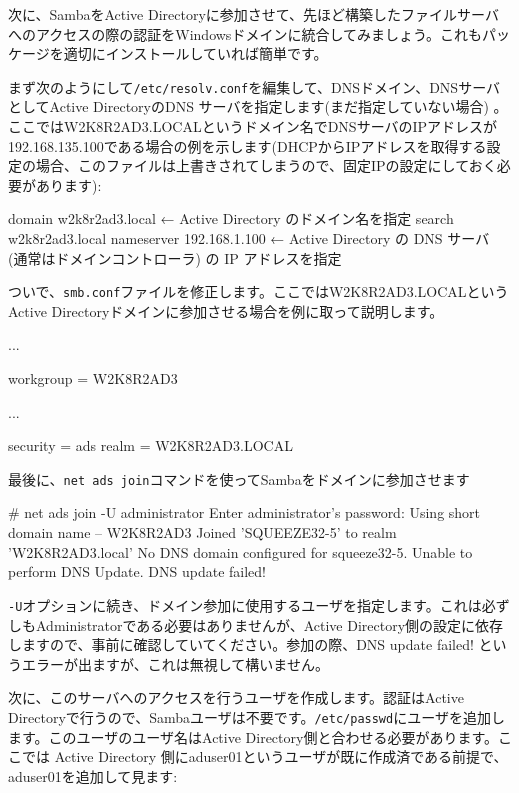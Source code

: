 \documentclass[mingoth,a4paper]{jsarticle}
\begin{document}
次に、SambaをActive Directoryに参加させて、先ほど構築したファイルサーバへのアクセスの際の認証をWindowsドメインに統合してみましょう。これもパッケージを適切にインストールしていれば簡単です。

まず次のようにして{\tt{/etc/resolv.conf}}を編集して、DNSドメイン、DNSサーバとしてActive DirectoryのDNS サーバを指定します(まだ指定していない場合) 。ここではW2K8R2AD3.LOCALというドメイン名でDNSサーバのIPアドレスが192.168.135.100である場合の例を示します(DHCPからIPアドレスを取得する設定の場合、このファイルは上書きされてしまうので、固定IPの設定にしておく必要があります):

\begin{commandline}
domain w2k8r2ad3.local ← Active Directory のドメイン名を指定
search w2k8r2ad3.local
nameserver 192.168.1.100 ← Active Directory の DNS サーバ (通常はドメインコントローラ) の IP アドレスを指定
\end{commandline}

ついで、{\tt{smb.conf}}ファイルを修正します。ここではW2K8R2AD3.LOCALというActive Directoryドメインに参加させる場合を例に取って説明します。

\begin{commandline}
[global]
  ...

  workgroup = W2K8R2AD3

  ...

  security = ads
  realm = W2K8R2AD3.LOCAL
\end{commandline}

最後に、{\tt{net ads join}}コマンドを使ってSambaをドメインに参加させます

\begin{commandline}
# net ads join -U administrator
Enter administrator's password:
Using short domain name -- W2K8R2AD3
Joined 'SQUEEZE32-5' to realm 'W2K8R2AD3.local'
No DNS domain configured for squeeze32-5. Unable to perform DNS Update.
DNS update failed!
\end{commandline}

{\tt{-U}}オプションに続き、ドメイン参加に使用するユーザを指定します。これは必ずしもAdministratorである必要はありませんが、Active Directory側の設定に依存しますので、事前に確認していてください。参加の際、DNS update failed! というエラーが出ますが、これは無視して構いません。

次に、このサーバへのアクセスを行うユーザを作成します。認証はActive Directoryで行うので、Sambaユーザは不要です。{\tt{/etc/passwd}}にユーザを追加します。このユーザのユーザ名はActive Directory側と合わせる必要があります。ここでは Active Directory 側にaduser01というユーザが既に作成済である前提で、aduser01を追加して見ます:
\end{document}
